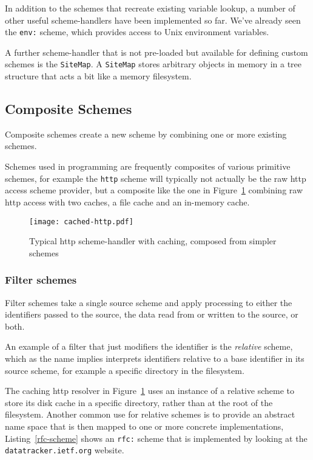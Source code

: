 \documentclass[preprint,authoryear]{llncs}
\begin{document}
In addition to the schemes that recreate existing variable lookup, a number
of other useful scheme-handlers have been implemented so far.  We've
already seen the {\tt env:} scheme, which provides access to Unix
environment variables.  

A further scheme-handler that is not pre-loaded but available for defining
custom schemes is the {\tt SiteMap}.  A {\tt SiteMap} stores arbitrary objects
in memory in a tree structure that acts a bit like a memory filesystem.

\subsection{Composite Schemes}
\label{compositeSchemes}
Composite schemes  create a new scheme by combining one or 
more existing schemes. 

 Schemes used in programming 
are frequently composites of various primitive schemes, for example
the {\tt http} scheme will typically not actually be the raw http access
scheme provider, but a composite like the one in Figure~\ref{fig:http-cached} combining
raw http access with two caches, a file cache and an in-memory cache.


\begin{figure}[htbp]
\centering
\texttt{[image: cached-http.pdf]}
\caption{Typical http scheme-handler with caching, composed from simpler schemes}
\label{fig:http-cached}

\end{figure}


\subsubsection{Filter schemes}
\label{filterschemes}
Filter schemes take a single source scheme and apply processing to either
the identifiers passed to the source,  the data read from or written to the source, or both.

An example of a filter that just modifiers the identifier is the \emph{relative}
scheme, which as the name implies interprets identifiers relative to a base
identifier in its source scheme, for example a specific directory in the
filesystem.  

The caching http resolver in Figure~\ref{fig:http-cached} uses an instance
of a relative scheme to store its disk cache in a specific directory, rather
than at the root of the filesystem.  Another common use for relative schemes
is to provide an abstract name space that is then mapped to one
or more  concrete implementations, Listing~\ref{rfc-scheme} shows
an {\tt rfc:} scheme that is implemented by looking at the {\tt datatracker.ietf.org}
website.
\end{document}
